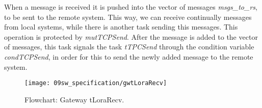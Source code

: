 When a message is received it is pushed into the vector of messages \textit{msgs\_to\_rs}, to be sent to the remote system. This way, we can receive continually messages from local systems, while there is another task sending this messages. This operation is protected by \textit{mutTCPSend}. After the message is added to the vector of messages, this task signals the task \textit{tTPCSend} through the condition variable \textit{condTCPSend}, in order for this to send the newly added message to the remote system.

\begin{figure}[H]
	\centering
	\texttt{[image: 09sw\_specification/gwtLoraRecv]}
	\caption{Flowchart: Gateway tLoraRecv.}
	\label{fig:gwtLoraRecv}
\end{figure}

%
%


